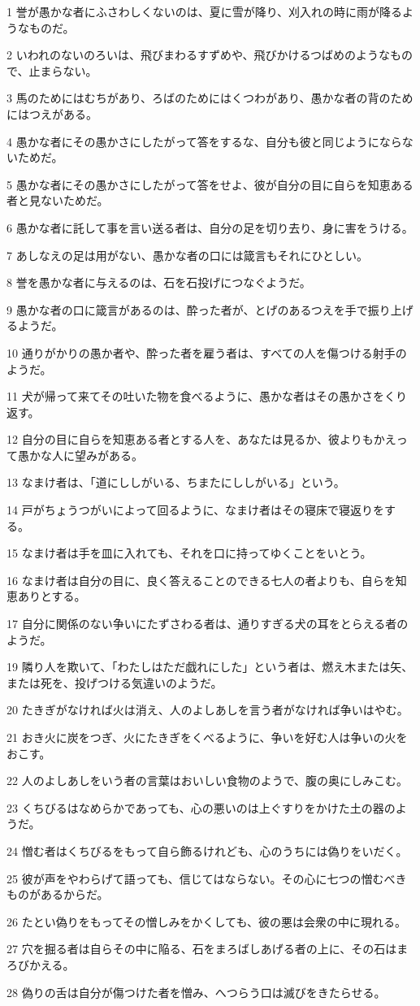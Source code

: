 \par 1 誉が愚かな者にふさわしくないのは、夏に雪が降り、刈入れの時に雨が降るようなものだ。
\par 2 いわれのないのろいは、飛びまわるすずめや、飛びかけるつばめのようなもので、止まらない。
\par 3 馬のためにはむちがあり、ろばのためにはくつわがあり、愚かな者の背のためにはつえがある。
\par 4 愚かな者にその愚かさにしたがって答をするな、自分も彼と同じようにならないためだ。
\par 5 愚かな者にその愚かさにしたがって答をせよ、彼が自分の目に自らを知恵ある者と見ないためだ。
\par 6 愚かな者に託して事を言い送る者は、自分の足を切り去り、身に害をうける。
\par 7 あしなえの足は用がない、愚かな者の口には箴言もそれにひとしい。
\par 8 誉を愚かな者に与えるのは、石を石投げにつなぐようだ。
\par 9 愚かな者の口に箴言があるのは、酔った者が、とげのあるつえを手で振り上げるようだ。
\par 10 通りがかりの愚か者や、酔った者を雇う者は、すべての人を傷つける射手のようだ。
\par 11 犬が帰って来てその吐いた物を食べるように、愚かな者はその愚かさをくり返す。
\par 12 自分の目に自らを知恵ある者とする人を、あなたは見るか、彼よりもかえって愚かな人に望みがある。
\par 13 なまけ者は、「道にししがいる、ちまたにししがいる」という。
\par 14 戸がちょうつがいによって回るように、なまけ者はその寝床で寝返りをする。
\par 15 なまけ者は手を皿に入れても、それを口に持ってゆくことをいとう。
\par 16 なまけ者は自分の目に、良く答えることのできる七人の者よりも、自らを知恵ありとする。
\par 17 自分に関係のない争いにたずさわる者は、通りすぎる犬の耳をとらえる者のようだ。
\par 19 隣り人を欺いて、「わたしはただ戯れにした」という者は、燃え木または矢、または死を、投げつける気違いのようだ。
\par 20 たきぎがなければ火は消え、人のよしあしを言う者がなければ争いはやむ。
\par 21 おき火に炭をつぎ、火にたきぎをくべるように、争いを好む人は争いの火をおこす。
\par 22 人のよしあしをいう者の言葉はおいしい食物のようで、腹の奥にしみこむ。
\par 23 くちびるはなめらかであっても、心の悪いのは上ぐすりをかけた土の器のようだ。
\par 24 憎む者はくちびるをもって自ら飾るけれども、心のうちには偽りをいだく。
\par 25 彼が声をやわらげて語っても、信じてはならない。その心に七つの憎むべきものがあるからだ。
\par 26 たとい偽りをもってその憎しみをかくしても、彼の悪は会衆の中に現れる。
\par 27 穴を掘る者は自らその中に陥る、石をまろばしあげる者の上に、その石はまろびかえる。
\par 28 偽りの舌は自分が傷つけた者を憎み、へつらう口は滅びをきたらせる。

